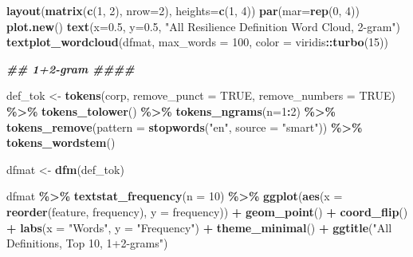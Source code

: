 \documentclass[
]{article}
\newenvironment{Shaded}{\begin{snugshade}}{\end{snugshade}}
\newcommand{\AttributeTok}[1]{\textcolor[rgb]{0.13,0.29,0.53}{#1}}
\newcommand{\ConstantTok}[1]{\textcolor[rgb]{0.56,0.35,0.01}{#1}}
\newcommand{\DecValTok}[1]{\textcolor[rgb]{0.00,0.00,0.81}{#1}}
\newcommand{\DocumentationTok}[1]{\textcolor[rgb]{0.56,0.35,0.01}{\textbf{\textit{#1}}}}
\newcommand{\FloatTok}[1]{\textcolor[rgb]{0.00,0.00,0.81}{#1}}
\newcommand{\FunctionTok}[1]{\textcolor[rgb]{0.13,0.29,0.53}{\textbf{#1}}}
\newcommand{\NormalTok}[1]{#1}
\newcommand{\OtherTok}[1]{\textcolor[rgb]{0.56,0.35,0.01}{#1}}
\newcommand{\SpecialCharTok}[1]{\textcolor[rgb]{0.81,0.36,0.00}{\textbf{#1}}}
\newcommand{\StringTok}[1]{\textcolor[rgb]{0.31,0.60,0.02}{#1}}
\begin{document}
\begin{Shaded}
\begin{Highlighting}[]
\FunctionTok{layout}\NormalTok{(}\FunctionTok{matrix}\NormalTok{(}\FunctionTok{c}\NormalTok{(}\DecValTok{1}\NormalTok{, }\DecValTok{2}\NormalTok{), }\AttributeTok{nrow=}\DecValTok{2}\NormalTok{), }\AttributeTok{heights=}\FunctionTok{c}\NormalTok{(}\DecValTok{1}\NormalTok{, }\DecValTok{4}\NormalTok{))}
\FunctionTok{par}\NormalTok{(}\AttributeTok{mar=}\FunctionTok{rep}\NormalTok{(}\DecValTok{0}\NormalTok{, }\DecValTok{4}\NormalTok{))}
\FunctionTok{plot.new}\NormalTok{()}
\FunctionTok{text}\NormalTok{(}\AttributeTok{x=}\FloatTok{0.5}\NormalTok{, }\AttributeTok{y=}\FloatTok{0.5}\NormalTok{, }\StringTok{"All Resilience Definition Word Cloud, 2{-}gram"}\NormalTok{)}
\FunctionTok{textplot\_wordcloud}\NormalTok{(dfmat, }\AttributeTok{max\_words =} \DecValTok{100}\NormalTok{, }\AttributeTok{color =}\NormalTok{ viridis}\SpecialCharTok{::}\FunctionTok{turbo}\NormalTok{(}\DecValTok{15}\NormalTok{))}

\DocumentationTok{\#\# 1+2{-}gram \#\#\#\#}

\NormalTok{def\_tok }\OtherTok{\textless{}{-}} \FunctionTok{tokens}\NormalTok{(corp, }\AttributeTok{remove\_punct =} \ConstantTok{TRUE}\NormalTok{, }\AttributeTok{remove\_numbers =} \ConstantTok{TRUE}\NormalTok{) }\SpecialCharTok{\%\textgreater{}\%} 
  \FunctionTok{tokens\_tolower}\NormalTok{() }\SpecialCharTok{\%\textgreater{}\%} 
  \FunctionTok{tokens\_ngrams}\NormalTok{(}\AttributeTok{n=}\DecValTok{1}\SpecialCharTok{:}\DecValTok{2}\NormalTok{) }\SpecialCharTok{\%\textgreater{}\%} 
  \FunctionTok{tokens\_remove}\NormalTok{(}\AttributeTok{pattern =} \FunctionTok{stopwords}\NormalTok{(}\StringTok{"en"}\NormalTok{, }\AttributeTok{source =} \StringTok{"smart"}\NormalTok{)) }\SpecialCharTok{\%\textgreater{}\%}
  \FunctionTok{tokens\_wordstem}\NormalTok{() }

\NormalTok{dfmat }\OtherTok{\textless{}{-}} \FunctionTok{dfm}\NormalTok{(def\_tok)}

\NormalTok{dfmat }\SpecialCharTok{\%\textgreater{}\%} 
  \FunctionTok{textstat\_frequency}\NormalTok{(}\AttributeTok{n =} \DecValTok{10}\NormalTok{) }\SpecialCharTok{\%\textgreater{}\%} 
  \FunctionTok{ggplot}\NormalTok{(}\FunctionTok{aes}\NormalTok{(}\AttributeTok{x =} \FunctionTok{reorder}\NormalTok{(feature, frequency), }\AttributeTok{y =}\NormalTok{ frequency)) }\SpecialCharTok{+}
  \FunctionTok{geom\_point}\NormalTok{() }\SpecialCharTok{+}
  \FunctionTok{coord\_flip}\NormalTok{() }\SpecialCharTok{+}
  \FunctionTok{labs}\NormalTok{(}\AttributeTok{x =} \StringTok{"Words"}\NormalTok{, }\AttributeTok{y =} \StringTok{"Frequency"}\NormalTok{) }\SpecialCharTok{+}
  \FunctionTok{theme\_minimal}\NormalTok{() }\SpecialCharTok{+} 
  \FunctionTok{ggtitle}\NormalTok{(}\StringTok{"All Definitions, Top 10, 1+2{-}grams"}\NormalTok{)}


\end{Highlighting}
\end{Shaded}
\end{document}
